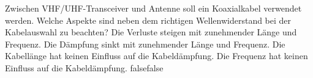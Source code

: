     {Zwischen VHF/UHF-Transceiver und Antenne soll ein Koaxialkabel verwendet werden. Welche Aspekte sind neben dem richtigen Wellenwiderstand bei der Kabelauswahl zu beachten?}
    {Die Verluste steigen mit zunehmender Länge und Frequenz.}
    {Die Dämpfung sinkt mit zunehmender Länge und Frequenz.}
    {Die Kabellänge hat keinen Einfluss auf die Kabeldämpfung.}
    {Die Frequenz hat keinen Einfluss auf die Kabeldämpfung.}
    {false}{false}